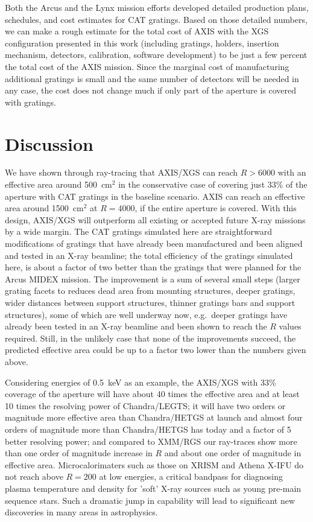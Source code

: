 \documentclass[12pt]{spieman}  %
\begin{document}
\begin{spacing}{1}
Both the Arcus and the Lynx mission efforts developed detailed production plans, schedules, and cost estimates for CAT gratings. Based on those detailed numbers, we can make a rough estimate for the total cost of AXIS with the XGS configuration presented in this work (including gratings, holders, insertion mechanism, detectors, calibration, software development) to be just a few percent the total cost of the AXIS mission.
Since the marginal cost of manufacturing additional gratings is small and the same number of detectors will be needed in any case, the cost does not change much if only part of the aperture is covered with gratings.

\section{Discussion}
We have shown through ray-tracing that AXIS/XGS can reach $R>6000$ with an effective area around 500~cm$^2$ in the conservative case of covering just 33\% of the aperture with CAT gratings in the baseline scenario. AXIS can reach an effective area around 1500~cm$^2$ at $R=4000$, if the entire aperture is covered. With this design, AXIS/XGS will outperform all existing or accepted future X-ray missions by a wide margin. The CAT gratings simulated here are straightforward modifications of gratings that have already been manufactured and been aligned and tested in an X-ray beamline\cite{2022arXiv220609013H}; the total efficiency of the gratings simulated here, is about a factor of two better than the gratings that were planned for the Arcus MIDEX mission. The improvement is a sum of several small steps (larger grating facets to reduces dead area from mounting structures, deeper gratings, wider distances between support structures, thinner gratings bars and support structures), some of which are well underway now, e.g.\ deeper gratings have already been tested in an X-ray beamline and been shown to reach the $R$ values required\cite{2022arXiv220609013H}. Still, in the unlikely case that none of the improvements succeed, the predicted effective area could be up to a factor two lower than the numbers given above.

Considering energies of 0.5~keV as an example, the AXIS/XGS with 33\% coverage of the aperture will have about 40 times the effective area and at least 10 times the resolving power of Chandra/LEGTS; it will have two orders or magnitude more effective area than Chandra/HETGS at launch and almost four orders of magnitude more than Chandra/HETGS has today and a factor of 5 better resolving power\cite{2005PASP..117.1144C}; and compared to XMM/RGS our ray-traces show more than one order of magnitude increase in $R$ and about one order of magnitude in effective area.
Microcalorimaters such as those on XRISM\cite{10.1117/12.2565812} and Athena X-IFU do not reach above $R=200$ at low energies, a critical bandpass for diagnosing plasma temperature and density for 'soft' X-ray sources such as young pre-main sequence stars. Such a dramatic jump in capability will lead to significant new discoveries in many areas in astrophysics.


\end{spacing}
\end{document}
